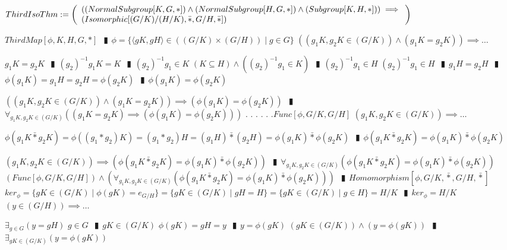 \documentclass{book}
\newcommand{\abr}{:=}
\newcommand{\cont}{\phantom{.}. . .\phantom{.}}
\newcommand{\pipe}{$\phantom{(}\vrectangleblack\phantom{)}$}
\newcommand{\bbin}[1]{\mathbin{{\bar{#1}}}}
\newcommand{\st}{\mathbin{|}}
\begin{document}
$ThirdIsoThm \abr \left(\begin{array}{ll}
  ((NormalSubgroup[K, G, *]) \hfill \land \hfill (NormalSubgroup[H, G, *]) \hfill \land \hfill (Subgroup[K, H, *])) \hfill \implies \hfill \\
  (Isomorphic[(G / K) / (H / K), \bbin{*}, G / H, \bbin{*}])
\end{array}\right)$
\begin{enumerate}
  \lit $ThirdMap[\phi, K, H, G, *]$ \pipe $\phi = \{\langle g K, g H \rangle \in ((G / K) \times (G / H)) \st g \in G\}$
  \lit $((g_1 K, g_2 K \in (G / K)) \land (g_1 K = g_2 K)) \implies \ldots$
  \begin{enumerate}
    \lit $g_1 K = g_2 K$ \pipe $(g_2)^{-1} g_1 K = K$ \pipe $(g_2)^{-1} g_1 \in K$
    \lit $(K \subseteq H) \land ((g_2)^{-1} g_1 \in K)$ \pipe $(g_2)^{-1} g_1 \in H$
    \lit $(g_2)^{-1} g_1 \in H$ \pipe $g_1 H = g_2 H$ \pipe $\phi(g_1 K) = g_1 H = g_2 H = \phi(g_2 K)$ \pipe $\phi(g_1 K) = \phi(g_2 K)$
  \end{enumerate}
  \lit $((g_1 K, g_2 K \in (G / K)) \land (g_1 K = g_2 K)) \implies (\phi(g_1 K) = \phi(g_2 K))$ \pipe $\forall_{g_1 K, g_2 K \in (G / K)}((g_1 K = g_2 K) \implies (\phi(g_1 K) = \phi(g_2 K)))$ \cont
  \lit \cont $Func[\phi, G / K, G / H]$
  \lit $(g_1 K, g_2 K \in (G / K)) \implies \ldots$
  \begin{enumerate}
    \lit $\phi(g_1 K \bbin{*} g_2 K) = \phi((g_1 * g_2) K) = (g_1 * g_2) H = (g_1 H) \bbin{*} (g_2 H) = \phi(g_1 K) \bbin{*} \phi(g_2 K)$ \pipe $\phi(g_1 K \bbin{*} g_2 K) = \phi(g_1 K) \bbin{*} \phi(g_2 K)$
  \end{enumerate}
  \lit $(g_1 K, g_2 K \in (G / K)) \implies (\phi(g_1 K \bbin{*} g_2 K) = \phi(g_1 K) \bbin{*} \phi(g_2 K))$ \pipe $\forall_{g_1 K, g_2 K \in (G / K)}(\phi(g_1 K \bbin{*} g_2 K) = \phi(g_1 K) \bbin{*} \phi(g_2 K))$
  \lit $(Func[\phi, G / K, G / H]) \land (\forall_{g_1 K, g_2 K \in (G / K)}(\phi(g_1 K \bbin{*} g_2 K) = \phi(g_1 K) \bbin{*} \phi(g_2 K)))$ \pipe $Homomorphism[\phi, G / K, \bbin{*}, G / H, \bbin{*}]$
  \lit $ker_\phi = \{g K \in (G / K) \st \phi(g K) = e_{G / H}\} = \{g K \in (G / K) \st g H = H\} = \{g K \in (G / K) \st g \in H\} = H / K$ \pipe $ker_\phi = H / K$
  \lit $(y \in (G / H)) \implies \ldots$
  \begin{enumerate}
    \lit $\exists_{g \in G}(y = g H)$
    \lit $g \in G$ \pipe $g K \in (G / K)$
    \lit $\phi(g K) = g H = y$ \pipe $y = \phi(g K)$
    \lit $(g K \in (G / K)) \land (y = \phi(g K))$ \pipe $\exists_{g K \in (G / K)}(y = \phi(g K))$

\end{enumerate}
\end{enumerate}
\end{document}
